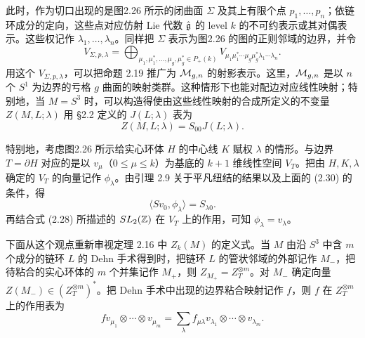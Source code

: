 此时，作为切口出现的是图2.26 所示的闭曲面 $\Sigma$ 及其上有限个点 $p_1,\dots,p_n$；依链环成分的定向，这些点对应仿射 Lie 代数 $\hat{\mathfrak{g}}$ 的 level $k$ 的不可约表示或其对偶表示。这些权记作 $\lambda_1,\dots,\lambda_n$。同样把 $\Sigma$ 表示为图2.26 的图的正则邻域的边界，并令
\[
  V_{\Sigma,p,\lambda}=\bigoplus_{\mu_1,\mu_1^*,\dots,\mu_g,\mu_g^*\in P_+(k)}V_{\mu_1\mu_1^*\cdots\mu_g\mu_g^*\lambda_1\cdots\lambda_n}.
\]
用这个 $V_{\Sigma,p,\lambda}$，可以把命题 2.19 推广为 $\mathcal{M}_{g,n}$ 的射影表示。这里，$\mathcal{M}_{g,n}$ 是以 $n$ 个 $S^1$ 为边界的亏格 $g$ 曲面的映射类群。这种情形下也能对配边对应线性映射；特别地，当 $M=S^3$ 时，可以构造得使由这些线性映射的合成所定义的不变量 $Z(M,L;\lambda)$ 用 §2.2 定义的 $J(L;\lambda)$ 表为
\begin{equation}
  Z(M,L;\lambda)=S_{00}J(L;\lambda). \tag{2.30}
\end{equation}

特别地，考虑图2.26 所示给实心环体 $H$ 的中心线 $K$ 赋权 $\lambda$ 的情形。与边界 $T=\partial H$ 对应的是以 $v_\mu$（$0\le\mu\le k$）为基底的 $k+1$ 维线性空间 $V_T$。把由 $H,K,\lambda$ 确定的 $V_T$ 的向量记作 $\phi_\lambda$。由引理 2.9 关于平凡纽结的结果以及上面的 (2.30) 的条件，得
\[
  \langle Sv_0,\phi_\lambda\rangle=S_{\lambda0}.
\]
再结合式 (2.28) 所描述的 $SL_2(\mathbb{Z})$ 在 $V_T$ 上的作用，可知 $\phi_\lambda=v_\lambda$。

下面从这个观点重新审视定理 2.16 中 $Z_k(M)$ 的定义式。当 $M$ 由沿 $S^3$ 中含 $m$ 个成分的链环 $L$ 的 Dehn 手术得到时，把链环 $L$ 的管状邻域的外部记作 $M_-$，把待粘合的实心环体的 $m$ 个并集记作 $M_+$，则 $Z_{M_+}=Z_T^{\otimes m}$。对 $M_-$ 确定向量 $Z(M_-)\in(Z_T^{\otimes m})^*$。把 Dehn 手术中出现的边界粘合映射记作 $f$，则 $f$ 在 $Z_T^{\otimes m}$ 上的作用表为
\[
  f v_{\mu_1}\otimes\cdots\otimes v_{\mu_m}=\sum_{\lambda}f_{\mu\lambda}v_{\lambda_1}\otimes\cdots\otimes v_{\lambda_m}.
\]

